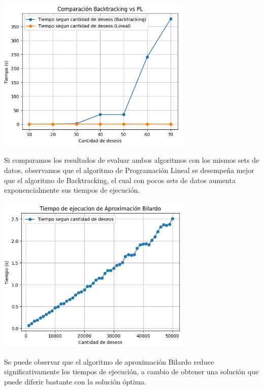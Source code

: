 \documentclass{estilo}
\begin{document}
\begin{center}
\includegraphics[width=0.7\textwidth]{img/backtracking_vs_pl.png}

Si comparamos los resultados de evaluar ambos algoritmos con los mismos sets de datos, observamos que el algoritmo de Programación Lineal se desempeña mejor que el algoritmo de Backtracking, el cual con pocos sets de datos aumenta exponencialmente sus tiempos de ejecución.
\end{center}

\begin{center}
\includegraphics[width=0.7\textwidth]{img/tiempo_bilardo.png}

Se puede observar que el algoritmo de aproximación Bilardo reduce significativamente los tiempos de ejecución, a cambio de obtener una solución que puede diferir bastante con la solución óptima.
\end{center}
\end{document}
